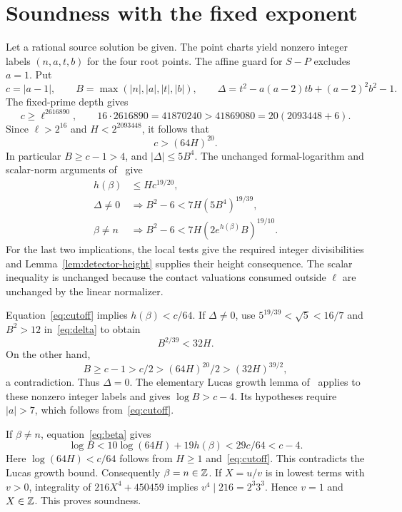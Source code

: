 \documentclass[11pt,a4paper]{article}
\begin{document}
\section{Soundness with the fixed exponent}

Let a rational source solution be given. The point charts yield
nonzero integer labels $(n,a,t,b)$ for the four root points.
The affine guard for $S-P$ excludes $a=1$. Put
\[
 c=|a-1|,\qquad B=\max(|n|,|a|,|t|,|b|),
 \qquad\Delta=t^2-a(a-2)tb+(a-2)^2b^2-1.
\]
The fixed-prime depth gives
\[
 c\ge\ell^{2616890},\qquad
 16\cdot2616890=41870240>41869080=20(2093448+6).
\]
Since $\ell>2^{16}$ and $H<2^{2093448}$, it follows that
\begin{equation}\label{eq:cutoff}
                         c>(64H)^{20}.
\end{equation}
In particular $B\ge c-1>4$, and $|\Delta|\le5B^4$.
The unchanged formal-logarithm and scalar-norm arguments
of~\cite{Baseline} give
\begin{align}
 h(\beta)&\le Hc^{19/20},\label{eq:betaheight}\\
 \Delta\ne0&\Longrightarrow
 B^2-6<7H(5B^4)^{19/39},\label{eq:delta}\\
 \beta\ne n&\Longrightarrow
 B^2-6<7H(2e^{h(\beta)}B)^{19/10}.\label{eq:beta}
\end{align}
For the last two implications, the local tests give the required
integer divisibilities and Lemma~\ref{lem:detector-height}
supplies their height consequence. The scalar inequality is
unchanged because the contact valuations consumed outside $\ell$
are unchanged by the linear normalizer.

Equation~\eqref{eq:cutoff} implies $h(\beta)<c/64$.
If $\Delta\ne0$, use $5^{19/39}<\sqrt5<16/7$ and
$B^2>12$ in~\eqref{eq:delta} to obtain
\[
                        B^{2/39}<32H.
\]
On the other hand,
\[
 B\ge c-1>c/2>(64H)^{20}/2>(32H)^{39/2},
\]
a contradiction. Thus $\Delta=0$.
The elementary Lucas growth lemma of~\cite{Baseline} applies
to these nonzero integer labels and gives $\log B>c-4$.
Its hypotheses require $|a|>7$, which follows from~\eqref{eq:cutoff}.

If $\beta\ne n$, equation~\eqref{eq:beta} gives
\[
 \log B<10\log(64H)+19h(\beta)
            <29c/64<c-4.
\]
Here $\log(64H)<c/64$ follows from $H\ge1$
and~\eqref{eq:cutoff}. This contradicts the Lucas growth bound.
Consequently $\beta=n\in\mathbb Z$.
If $X=u/v$ is in lowest terms with $v>0$, integrality of
$216X^4+450459$ implies $v^4\mid216=2^3 3^3$.
Hence $v=1$ and $X\in\mathbb Z$. This proves soundness.
\end{document}
